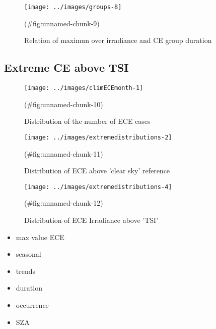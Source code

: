 \documentclass[
]{article}
\providecommand{\tightlist}{%
  \setlength{\itemsep}{0pt}\setlength{\parskip}{0pt}}
\begin{document}
\begin{figure}[h!]

{\centering \texttt{[image: ../images/groups-8]} 

}

\caption{Relation of maximun over irradiance and CE group duration}(\#fig:unnamed-chunk-9)
\end{figure}

\FloatBarrier

\hypertarget{extreme-ce-above-tsi}{%
\subsection{Extreme CE above TSI}\label{extreme-ce-above-tsi}}

\begin{figure}[h!]

{\centering \texttt{[image: ../images/climECEmonth-1]} 

}

\caption{Distribution of the number of ECE cases}(\#fig:unnamed-chunk-10)
\end{figure}

\begin{figure}[h!]

{\centering \texttt{[image: ../images/extremedistributions-2]} 

}

\caption{Distribution of ECE above 'clear sky' reference}(\#fig:unnamed-chunk-11)
\end{figure}

\begin{figure}[h!]

{\centering \texttt{[image: ../images/extremedistributions-4]} 

}

\caption{Distribution of ECE Irradiance above 'TSI'}(\#fig:unnamed-chunk-12)
\end{figure}

\begin{itemize}
\tightlist
\item
  max value ECE
\item
  seasonal
\item
  trends
\item
  duration
\item
  occurrence
\item
  SZA
\end{itemize}
\end{document}
